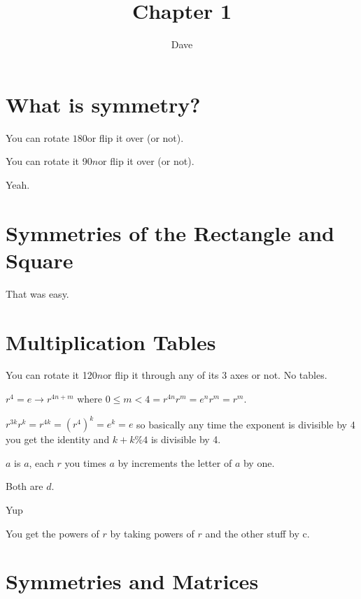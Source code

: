 \documentclass[11pt, oneside]{article}   	%
\title{Chapter 1}
\author{Dave}
\begin{document}
\maketitle

\section{What is symmetry?}

\be
\item You can rotate $180$\textdegree or flip it over (or not).
\item You can rotate it 90$n$\textdegree or flip it over (or not).
\item Yeah.
\ee

\section{Symmetries of the Rectangle and Square}

That was easy.

\section{Multiplication Tables}

\be
\item You can rotate it 120$n$\textdegree or flip it through any of its 3 axes or not. No tables.
\item \be
\item $r^4 = e \rightarrow r^{4n+m}$ where $0 \le m < 4 = r^{4n}r^m = e^nr^m = r^m$. 
\item $r^{3k}r^k = r^{4k} = (r^4)^k = e^k = e$ so basically any time the exponent is divisible by 4 you get the identity and $k + k \% 4$ is divisible by 4.
\ee
\item \be
\item $a$ is $a$, each $r$ you times $a$ by increments the letter of $a$ by one.
\item Both are $d$.
\item Yup
\item You get the powers of $r$ by taking powers of $r$ and the other stuff by c.
\ee
\ee

\section{Symmetries and Matrices}
\end{document}
